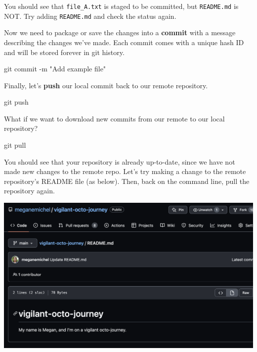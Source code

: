\documentclass[
  letterpaper,
]{book}
\newenvironment{Shaded}{}{}
\newcommand{\AttributeTok}[1]{\textcolor[rgb]{0.84,0.23,0.29}{#1}}
\newcommand{\FunctionTok}[1]{\textcolor[rgb]{0.44,0.26,0.76}{#1}}
\newcommand{\NormalTok}[1]{\textcolor[rgb]{0.14,0.16,0.18}{#1}}
\newcommand{\StringTok}[1]{\textcolor[rgb]{0.01,0.18,0.38}{#1}}
\begin{document}
You should see that \texttt{file\_A.txt} is staged to be committed, but
\texttt{README.md} is NOT. Try adding \texttt{README.md} and check the
status again.

Now we need to package or save the changes into a \textbf{commit} with a
message describing the changes we've made. Each commit comes with a
unique hash ID and will be stored forever in git history.

\begin{Shaded}
\begin{Highlighting}[]
\FunctionTok{git}\NormalTok{ commit }\AttributeTok{{-}m} \StringTok{"Add example file"}
\end{Highlighting}
\end{Shaded}

Finally, let's \textbf{push} our local commit back to our remote
repository.

\begin{Shaded}
\begin{Highlighting}[]
\FunctionTok{git}\NormalTok{ push}
\end{Highlighting}
\end{Shaded}

What if we want to download new commits from our remote to our local
repository?

\begin{Shaded}
\begin{Highlighting}[]
\FunctionTok{git}\NormalTok{ pull}
\end{Highlighting}
\end{Shaded}

You should see that your repository is already up-to-date, since we have
not made new changes to the remote repo. Let's try making a change to
the remote repository's README file (as below). Then, back on the
command line, pull the repository again.

\includegraphics{assets/images/chapters/introduction-to-git/git_pull.png}
\end{document}
